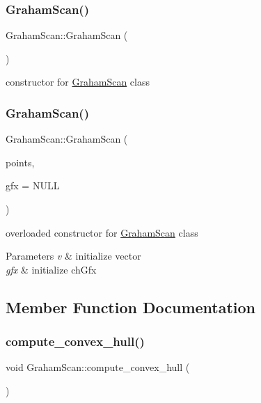 \subsubsection{\texorpdfstring{GrahamScan()}{GrahamScan()}\hspace{0.1cm}{\footnotesize\ttfamily [1/2]}}
{\footnotesize\ttfamily Graham\+Scan\+::\+Graham\+Scan (\begin{DoxyParamCaption}{ }\end{DoxyParamCaption})}

constructor for \mbox{\hyperlink{class_graham_scan}{Graham\+Scan}} class \mbox{\label{class_graham_scan_afb51d5144cdee5df588528701b63de36}} 
\subsubsection{\texorpdfstring{GrahamScan()}{GrahamScan()}\hspace{0.1cm}{\footnotesize\ttfamily [2/2]}}
{\footnotesize\ttfamily Graham\+Scan\+::\+Graham\+Scan (\begin{DoxyParamCaption}\item[{std\+::vector$<$ \mbox{\hyperlink{class_point}{Point}} $>$ \&}]{points,  }\item[{\mbox{\hyperlink{class_convex_hull_graphix}{Convex\+Hull\+Graphix}} $\ast$}]{gfx = {\ttfamily NULL} }\end{DoxyParamCaption})}

overloaded constructor for \mbox{\hyperlink{class_graham_scan}{Graham\+Scan}} class 
\begin{DoxyParams}{Parameters}
{\em v} & initialize vector \\
\hline
{\em gfx} & initialize ch\+Gfx \\
\hline
\end{DoxyParams}


\subsection{Member Function Documentation}
\mbox{\label{class_graham_scan_a38ecf7b830f7923c4d889fa126349a7e}} 
\subsubsection{\texorpdfstring{compute\_convex\_hull()}{compute\_convex\_hull()}}
{\footnotesize\ttfamily void Graham\+Scan\+::compute\+\_\+convex\+\_\+hull (\begin{DoxyParamCaption}{ }\end{DoxyParamCaption})}

